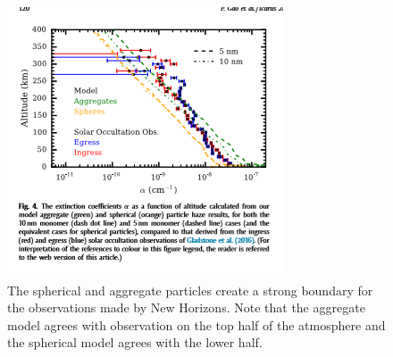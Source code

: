 \documentclass[useAMS,natbib]{mn2e}
\begin{document}
\begin{figure}\centering
\includegraphics[scale = 0.6]{extinction_pluto}
\caption{The spherical and aggregate particles create a strong boundary for the observations made by New Horizons. Note that the aggregate model agrees with observation on the top half of the atmosphere and the spherical model agrees with the lower half.}
\label{ext_pluto}
\end{figure}
\end{document}
